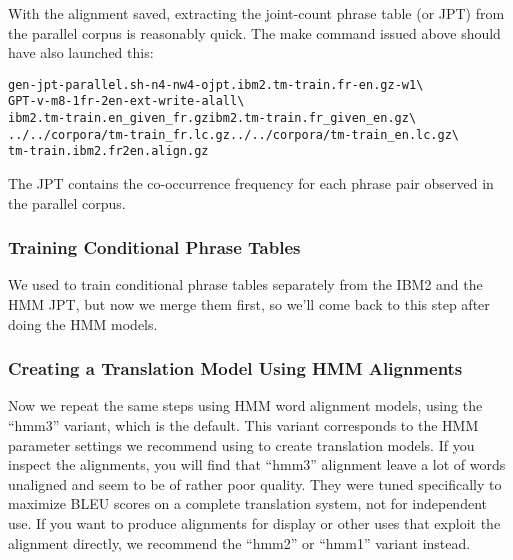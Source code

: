\documentclass[11pt,letterpaper]{article}
\newcommand{\bs}{\textbackslash{}}
\begin{document}
With the alignment saved, extracting the joint-count phrase table (or JPT) from
the parallel corpus is reasonably quick.  The make command issued above should
have also launched this:
\begin{small}
\begin{alltt}
   gen-jpt-parallel.sh -n 4 -nw 4 -o jpt.ibm2.tm-train.fr-en.gz -w 1 \bs
      GPT -v -m 8 -1 fr -2 en -ext -write-al all \bs
      ibm2.tm-train.en_given_fr.gz ibm2.tm-train.fr_given_en.gz \bs
      ../../corpora/tm-train_fr.lc.gz ../../corpora/tm-train_en.lc.gz \bs
      tm-train.ibm2.fr2en.align.gz
\end{alltt}
\end{small}
The JPT contains the co-occurrence frequency for each phrase pair observed in
the parallel corpus.

\subsubsection*{Training Conditional Phrase Tables}

We used to train conditional phrase tables separately from the IBM2 and the HMM
JPT, but now we merge them first, so we'll come back to this step after doing
the HMM models.

\subsubsection{Creating a Translation Model Using HMM Alignments} \label{HMM}

Now we repeat the same steps using HMM word alignment models, using the
``hmm3'' variant, which is the default.  This variant corresponds to the HMM
parameter settings we recommend using to create translation models.  If you
inspect the alignments, you will find that ``hmm3'' alignment leave a lot of
words unaligned and seem to be of rather poor quality.  They were tuned
specifically to maximize BLEU scores on a complete translation system, not for
independent use.  If you want to produce alignments for display or other uses
that exploit the alignment directly, we recommend the ``hmm2'' or ``hmm1''
variant instead.
\end{document}
